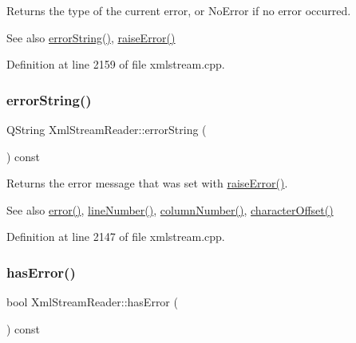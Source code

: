 Returns the type of the current error, or No\+Error if no error occurred.

\begin{DoxySeeAlso}{See also}
\hyperlink{class_xml_stream_reader_a119d913daa2a7b8174f0b26dcd7e9720}{error\+String()}, \hyperlink{class_xml_stream_reader_aae008ac9078fb7edb4a77ba3e76b8dfa}{raise\+Error()} 
\end{DoxySeeAlso}


Definition at line 2159 of file xmlstream.\+cpp.

\mbox{\label{class_xml_stream_reader_a119d913daa2a7b8174f0b26dcd7e9720}} 
\subsubsection{\texorpdfstring{error\+String()}{errorString()}}
{\footnotesize\ttfamily Q\+String Xml\+Stream\+Reader\+::error\+String (\begin{DoxyParamCaption}{ }\end{DoxyParamCaption}) const}

Returns the error message that was set with \hyperlink{class_xml_stream_reader_aae008ac9078fb7edb4a77ba3e76b8dfa}{raise\+Error()}.

\begin{DoxySeeAlso}{See also}
\hyperlink{class_xml_stream_reader_ae9a7e8fe9f15b0f5c4ec5fa080c6249f}{error()}, \hyperlink{class_xml_stream_reader_a74a3827867942f9904924f2004c4177e}{line\+Number()}, \hyperlink{class_xml_stream_reader_a88724d9577a835b0e8d84ed945c306df}{column\+Number()}, \hyperlink{class_xml_stream_reader_a08a187eb8969ddabf238e1f731bb754a}{character\+Offset()} 
\end{DoxySeeAlso}


Definition at line 2147 of file xmlstream.\+cpp.

\mbox{\label{class_xml_stream_reader_a26bc2d6831322e5a1d86182295f912d0}} 
\subsubsection{\texorpdfstring{has\+Error()}{hasError()}}
{\footnotesize\ttfamily bool Xml\+Stream\+Reader\+::has\+Error (\begin{DoxyParamCaption}{ }\end{DoxyParamCaption}) const\hspace{0.3cm}{\ttfamily [inline]}}


